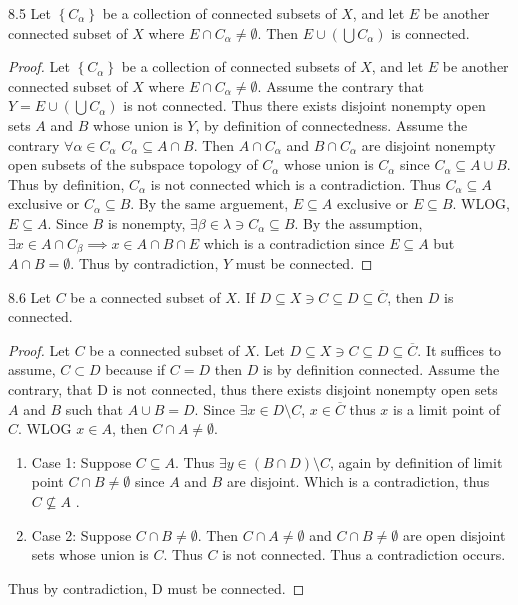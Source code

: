 \documentclass{article}
\newcommand*{\subeq}{\subseteq}
\newcommand*{\empset}{\emptyset}
\begin{document}
\begin{claim}{8.5}\label{Claim 8.5.}
    Let $\left\{ C_\alpha \right\}$ be a collection of connected subsets of $X$, and let $E$ be another connected subset of $X$ where $E \cap C_\alpha \neq \empset$. Then $E \cup \left(\bigcup C_\alpha\right)$ is connected.       
\end{claim}
\begin{proof}
    Let $\left\{ C_\alpha \right\}$ be a collection of connected subsets of $X$, and let $E$ be another connected subset of $X$ where $E \cap C_\alpha \neq \empset$. Assume the contrary that $Y = E \cup \left(\bigcup C_\alpha\right)$ is not connected. Thus there exists disjoint nonempty open sets $A$ and $B$ whose union is $Y$, by definition of connectedness. Assume the contrary $\forall \alpha \in C_\alpha$ $C_\alpha \subeq A \cap B$. Then $A \cap C_\alpha$ and $B \cap C_\alpha$ are disjoint nonempty open subsets of the subspace topology of $C_\alpha$ whose union is $C_\alpha$ since $C_\alpha \subeq A \cup B$. Thus by definition, $C_\alpha$ is not connected which is a contradiction. Thus $C_\alpha \subeq A$ exclusive or $C_\alpha \subeq B$. By the same arguement, $E \subeq A$ exclusive or $E \subeq B$. WLOG, $E \subeq A$. Since $B$ is nonempty, $\exists \beta \in \lambda \ni C_\alpha \subeq B$. By the assumption, $\exists x \in A \cap C_\beta \implies x \in A \cap B \cap E$ which is a contradiction since $E \subeq A$ but $A \cap B = \empset$. Thus by contradiction, $Y$ must be connected.        
\end{proof}

\bigskip

\begin{claim}{8.6}\label{Claim 8.6.}
    Let $C$ be a connected subset of $X$. If $D \subeq X \ni C \subeq D \subeq \overline{C}$, then $D$ is connected.     
\end{claim}
\begin{proof}
    Let $C$ be a connected subset of $X$. Let $D \subeq X \ni C \subeq D \subeq \overline{C}$. It suffices to assume, $C \subset D$ because if $C = D$ then $D$ is by definition connected. Assume the contrary, that D is not connected, thus there exists disjoint nonempty open sets $A$ and $B$ such that $A \cup B = D$. Since $\exists x \in D \setminus C$, $x \in \overline{C}$ thus $x$ is a limit point of $C$. WLOG $x \in A$, then $C \cap A \neq \empset$. 
    
    \begin{enumerate}
        \item Case 1: Suppose $C \subeq A$. Thus $\exists y \in (B \cap D) \setminus C$, again by definition of limit point $C \cap B \neq \empset$ since $A$ and $B$ are disjoint. Which is a contradiction, thus $C \not \subeq A$ . 
        \item Case 2: Suppose $C \cap B \neq \empset$. Then $C \cap A \neq \empset$ and $C \cap B \neq \empset$ are open disjoint sets whose union is $C$. Thus $C$ is not connected. Thus a contradiction occurs.      
    \end{enumerate}

    Thus by contradiction, D must be connected.  
\end{proof}
\end{document}
